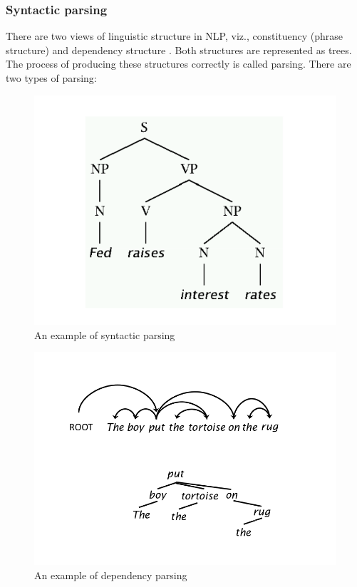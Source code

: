 \subsubsection{Syntactic parsing}

There are two views of linguistic structure in NLP, viz., constituency (phrase structure) and dependency structure \cite{parsing}. Both structures are represented as trees. The process of producing these structures correctly is called parsing. There are two types of parsing:

\begin{figure}
\centering
\includegraphics[scale=0.6]{figures/SyntacticParse.png}
\caption{An example of syntactic parsing}\label{fig:SynParse}
\end{figure}

\begin{figure}
\centering
\includegraphics[scale=0.4]{figures/DependencyParse.png}
\caption{An example of dependency parsing}\label{fig:DepParse}
\end{figure}


